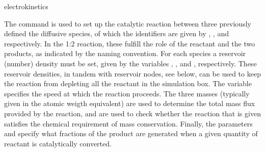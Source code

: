 \begin{essyntax}
  electrokinetics 
  \begin{features}
  \end{features}
\end{essyntax}
The  command is used to set up the catalytic reaction
between three previously defined the diffusive species, of which the identifiers 
are given by , , and 
respectively. In the 1:2 reaction, these fulfill the role of the reactant and 
the two products, as indicated by the naming convention. For each species a 
reservoir (number) density must be set, given by the variables
, , and
, respectively. These reservoir densities, in tandem
with reservoir nodes, see below, can be used to keep the reaction from depleting
all the reactant in the simulation box. The  variable specifies
the speed at which the reaction proceeds. The three masses (typically given in 
the atomic weigth equivalent) are used to determine the total mass flux provided
by the reaction, and are used to check whether the reaction that is given satisfies
the chemical requirement of mass conservation. Finally, the parameters
 and  specify
what fractions of the product are generated when a given quantity of reactant is
catalytically converted.

